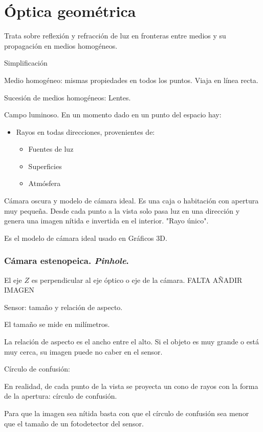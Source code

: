 \documentclass[a4paper]{book}
\begin{document}
\section{Óptica geométrica}

Trata sobre reflexión y refracción de luz en fronteras entre medios y su propagación en medios homogéneos.

Simplificación

Medio homogéneo: mismas propiedades en todos los puntos. Viaja en línea recta.

Sucesión de medios homogéneos: Lentes.

Campo luminoso. En un momento dado en un punto del espacio hay:
\begin{itemize}
	\item Rayos en todas direcciones, provenientes de:
	      \begin{itemize}
		      \item Fuentes de luz
		      \item Superficies
		      \item Atmósfera
	      \end{itemize}
\end{itemize}

Cámara oscura y modelo de cámara ideal. Es una caja o habitación con apertura muy pequeña. Desde cada punto a la vista solo pasa luz en una dirección y genera una imagen nítida e invertida en el interior. "Rayo único".

Es el modelo de cámara ideal usado en Gráficos 3D.



\subsubsection{Cámara estenopeica. \textit{Pinhole}.}

El eje $Z$ es perpendicular al eje óptico o eje de la cámara. FALTA AÑADIR IMAGEN

Sensor: tamaño y relación de aspecto.

El tamaño se mide en milímetros.

La relación de aspecto es el ancho entre el alto. Si el objeto es muy grande o está muy cerca, su imagen puede no caber en el sensor.

Círculo de confusión:

En realidad, de cada punto de la vista se proyecta un cono de rayos con la forma de la apertura: círculo de confusión.

Para que la imagen sea nítida basta con que el círculo de confusión sea menor que el tamaño de un fotodetector del sensor.
\end{document}
